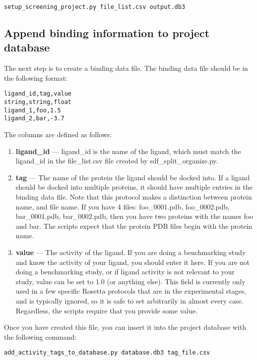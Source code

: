 \begin{verbatim}
setup_screening_project.py file_list.csv output.db3 
\end{verbatim}

\subsection{Append binding information to project database}

The next step is to create a binding data file. The binding data file should be in the following format:

\begin{verbatim}
ligand_id,tag,value
string,string,float
ligand_1,foo,1.5
ligand_2,bar,-3.7
\end{verbatim}

The columns are defined as follows:

\begin{enumerate}
\def\labelenumi{\arabic{enumi}.}
\item
  \textbf{ligand\_id} --- ligand\_id is the name of the ligand, which must match the ligand\_id in the file\_list.csv file created by sdf\_split\_organize.py.
\item
  \textbf{tag} --- The name of the protein the ligand should be docked into. If a ligand should be docked into multiple proteins, it should have multiple entries in the binding data file.
  Note that this protocol makes a distinction between protein name, and file name.
  If you have 4 files: foo\_0001.pdb, foo\_0002.pdb, bar\_0001.pdb, bar\_0002.pdb, then you have two proteins with the names foo and bar.
  The scripts expect that the protein PDB files begin with the protein name.
\item
  \textbf{value} --- The activity of the ligand. If you are doing a benchmarking study and know the activity of your ligand, you should enter it here.
  If you are not doing a benchmarking study, or if ligand activity is not relevant to your study, value can be set to 1.0 (or anything else). 
  This field is currently only used in a few specific Rosetta protocols that are in the experimental stages, and is typically ignored, so it is safe to set arbitrarily in almost every case.
  Regardless, the scripts require that you provide some value.
\end{enumerate}

Once you have created this file, you can insert it into the project
database with the following command:

\begin{verbatim}
add_activity_tags_to_database.py database.db3 tag_file.csv
\end{verbatim}

